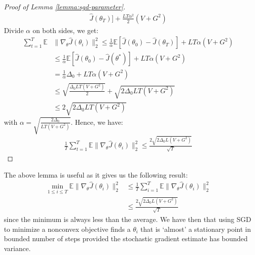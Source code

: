 \begin{proof}[Proof of Lemma \ref{lemma:sgd-parameter}]
\begin{align*}
                            \hat{J}(\theta_T)] + \frac{LT\alpha^2}{2}(V+G^2)
\end{align*} Divide $\alpha$  on both sides, we get:
\begin{align*}
    \sum_{t=1}^{T} \mathbb{E}&\|\nabla_\theta \hat{J}(\theta_i)\|_2^2 \leq \frac{1}{\alpha} \mathbb{E}[\hat{J}(\theta_0) - \hat{J}(\theta_T)] + {LT\alpha} (V+G^2) \\
    & \leq \frac{1}{\alpha} \mathbb{E}[\hat{J}(\theta_0) - \hat{J}(\theta^*)] + {LT\alpha} (V+G^2)  \\
    & = \frac{1}{\alpha} \Delta_0 + {LT\alpha} (V+G^2)  \\
    & \leq \sqrt{\frac{\Delta_0LT(V+G^2)}{2}} + \sqrt{2\Delta_0
      LT(V+G^2)} \\
      &\leq 2\sqrt{2\Delta_0 LT(V+G^2)}
\end{align*} with $\alpha = \sqrt{\frac{2\Delta_0}{LT(V+G^2)}}$.
Hence, we have:
\begin{align*}
    \frac{1}{T}\sum_{t=1}^T\mathbb{E}\|\nabla_\theta \hat{J}(\theta_i)\|_2^2 \leq \frac{2\sqrt{2\Delta_0 L(V+G^2)}}{\sqrt{T}}
\end{align*}
\end{proof}



The above lemma is useful as it gives us the following result:
\begin{align}
  \label{eq:stationary-point}
  \min_{1 \leq i \leq T} \mathbb{E}\|\nabla_\theta\hat{J}(\theta_i)\|_2^2 &\leq \frac{1}{T} \sum_{i=1}^T \mathbb{E}\|\nabla_\theta
                                                               \hat{J}(\theta_i)\|_2^2
                                                               \nonumber
  \\
                                                             &\leq \frac{2\sqrt{2\Delta_0L(V+G^2)}}{\sqrt{T}}
\end{align}
since the minimum is always less than the average. We have then that
using SGD to minimize a nonconvex objective finds a $\theta_i$ that is
`almost' a stationary point in bounded number of steps provided the
stochastic gradient estimate has bounded variance.

